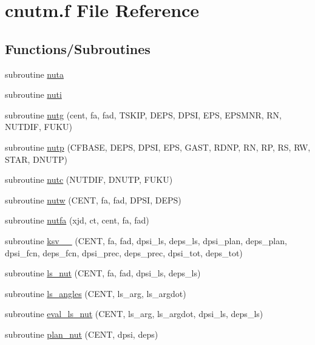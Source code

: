 \hypertarget{cnutm_8f}{}\section{cnutm.\+f File Reference}
\label{cnutm_8f}
\subsection*{Functions/\+Subroutines}
\begin{DoxyCompactItemize}
\item 
subroutine \hyperlink{cnutm_8f_a90f07365fe0e062ccb9d1f6d5336f048}{nuta}
\item 
subroutine \hyperlink{cnutm_8f_a7b8f108b2d99de06a08f43b860fd02d7}{nuti}
\item 
subroutine \hyperlink{cnutm_8f_a1f3f4250e6bf2547e3d3d5311f6ac534}{nutg} (cent, fa, fad, T\+S\+K\+IP, D\+E\+PS, D\+P\+SI, E\+PS, E\+P\+S\+M\+NR, RN, N\+U\+T\+D\+IF, F\+U\+KU)
\item 
subroutine \hyperlink{cnutm_8f_a97cf6a635caca92a8f2a0dd0f21c59b2}{nutp} (C\+F\+B\+A\+SE, D\+E\+PS, D\+P\+SI, E\+PS, G\+A\+ST, R\+D\+NP, RN, RP, RS, RW, S\+T\+AR, D\+N\+U\+TP)
\item 
subroutine \hyperlink{cnutm_8f_a3611511346a38c9a7f7d8553b0b80c1e}{nutc} (N\+U\+T\+D\+IF, D\+N\+U\+TP, F\+U\+KU)
\item 
subroutine \hyperlink{cnutm_8f_a3e3e399e615ed939a743d989ccc434c6}{nutw} (C\+E\+NT, fa, fad, D\+P\+SI, D\+E\+PS)
\item 
subroutine \hyperlink{cnutm_8f_a51fadb52934f7a3845784c1c1d5ff7c4}{nutfa} (xjd, ct, cent, fa, fad)
\item 
subroutine \hyperlink{cnutm_8f_ad343cebc6d52dc7daa6aa5357606a022}{ksv\+\_\+\_} (C\+E\+NT, fa, fad, dpsi\+\_\+ls, deps\+\_\+ls, dpsi\+\_\+plan, deps\+\_\+plan, dpsi\+\_\+fcn, deps\+\_\+fcn, dpsi\+\_\+prec, deps\+\_\+prec, dpsi\+\_\+tot, deps\+\_\+tot)
\item 
subroutine \hyperlink{cnutm_8f_ad52f41287720323f63d7b3e5df97341a}{ls\+\_\+nut} (C\+E\+NT, fa, fad, dpsi\+\_\+ls, deps\+\_\+ls)
\item 
subroutine \hyperlink{cnutm_8f_afed186bc98891de660532529d2b4a495}{ls\+\_\+angles} (C\+E\+NT, ls\+\_\+arg, ls\+\_\+argdot)
\item 
subroutine \hyperlink{cnutm_8f_a68c7e27fb3948f58df8aeeb580be43f4}{eval\+\_\+ls\+\_\+nut} (C\+E\+NT, ls\+\_\+arg, ls\+\_\+argdot, dpsi\+\_\+ls, deps\+\_\+ls)
\item 
subroutine \hyperlink{cnutm_8f_aba925b3b46e47b2fba6a156e2e0a3f7b}{plan\+\_\+nut} (C\+E\+NT, dpsi, deps)

\end{DoxyCompactItemize}
